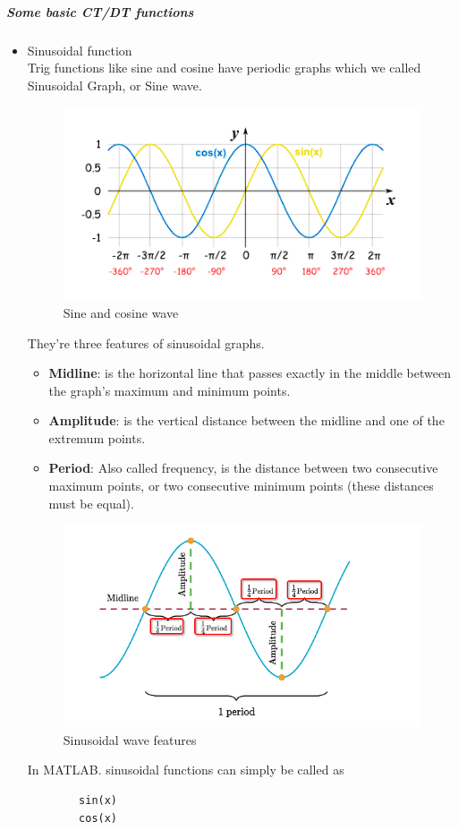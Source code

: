 \documentclass[12pt]{article}
\begin{document}
\subparagraph{Some basic CT/DT functions}
\begin{itemize}
    \item Sinusoidal function\\
    Trig functions like sine and cosine have periodic graphs which we called Sinusoidal Graph, or Sine wave.
    \begin{figure}[h!]
        \centering
        \includegraphics{labss/Lab2_TH_Sine.PNG}
        \caption{Sine and cosine wave}
    \end{figure}
    They’re three features of sinusoidal graphs.
    \begin{itemize}
        \item  {\bfseries Midline}: is the horizontal line that passes exactly in the middle between the graph's maximum and minimum points.
        \item {\bfseries Amplitude}: is the vertical distance between the midline and one of the extremum points.
        \item {\bfseries Period}: Also called frequency, is the distance between two consecutive maximum points, or two consecutive minimum points (these distances must be equal).
    \end{itemize}
    \begin{figure}[h!]
        \centering
        \includegraphics[scale = 0.7]{labss/Lab2_TH_Sine_Props.PNG}
        \caption{Sinusoidal wave features} 
    \end{figure}
    In MATLAB. sinusoidal functions can simply be called as 
    \begin{verbatim}
        sin(x)
        cos(x)
    \end{verbatim}
    

\end{itemize}
\end{document}
